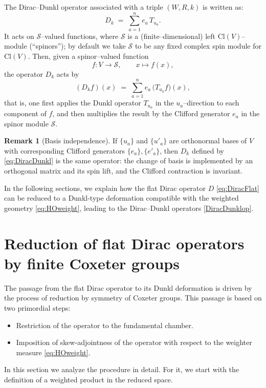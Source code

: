 \documentclass[12pt]{article}
\newcommand{\Cl}{\mathrm{Cl}}
\newcommand{\1}{\mathbbm{1}}
\theoremstyle{definition}
\newtheorem{remark}{Remark}
\begin{document}
The {Dirac--Dunkl operator} associated with a triple $(W,R,k)$ is written as:
\begin{equation}\label{eq:DiracDunkl}
  D_{k} \;=\; \sum_{a=1}^{n} e_{a}\,T_{u_{a}} .
\end{equation}
It acts on $\mathcal{S}$--valued functions, where $\mathcal{S}$ is a (finite--dimensional)
left $\Cl(V)$--module (``spinors''); by default we take $\mathcal{S}$ to be any fixed
complex spin module for $\Cl(V)$. Then, given a spinor--valued function 
\[
f : V \longrightarrow \mathcal{S}, \qquad 
x \mapsto f(x),
\] 
the operator $D_k$ acts by
\begin{equation}\label{DiracDunklop}
(D_k f)(x) \;=\; 
\sum_{a=1}^n e_a \, \big(T_{u_a} f\big)(x),
\end{equation}
that is, one first applies the Dunkl operator $T_{u_a}$ in the $u_a$--direction to each component of $f$, 
and then multiplies the result by the Clifford generator $e_a$ in the spinor module $\mathcal{S}$.



\begin{remark}[Basis independence]
If $\{u_{a}\}$ and $\{u'_{a}\}$ are orthonormal bases of $V$ with corresponding Clifford
generators $\{e_{a}\},\{e'_{a}\}$, then $D_{k}$ defined by \eqref{eq:DiracDunkl} is the
same operator: the change of basis is implemented by an orthogonal matrix and its spin
lift, and the Clifford contraction is invariant.
\end{remark}

In the following sections, we explain how the flat Dirac operator $D$ \eqref{eq:DiracFlat} can be reduced to a Dunkl-type deformation
compatible with the weighted geometry \eqref{eq:HOweight}, leading to the
Dirac--Dunkl operators \eqref{DiracDunklop}.


\section{Reduction of flat Dirac operators by finite Coxeter groups}

The passage from the flat Dirac operator to its Dunkl deformation is driven by the process of reduction by symmetry of Coxeter groups. This passage is based on two primordial steps:

\begin{itemize}
\item Restriction of the operator to the fundamental chamber.
\item Imposition of skew-adjointness of the operator with respect to the weighter measure \eqref{eq:HOweight}. 
\end{itemize}
\noindent
 In this section we analyze the procedure in detail. For it, we start with the definition of a weighted product in the reduced space.
\end{document}
